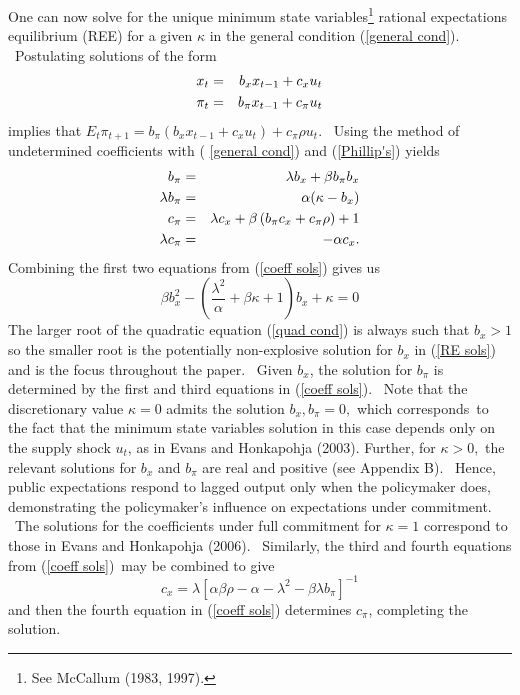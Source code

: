 \documentclass{article}
\begin{document}
\begin{doublespace}
One can now solve for the unique minimum state variables\footnote{%
See McCallum (1983, 1997).} rational expectations equilibrium (REE) for a
given $\kappa $ in the general condition (\ref{general cond}). \ Postulating
solutions of the form%
\begin{eqnarray}
x_{t} &=&b_{x}x_{t-1}+c_{x}u_{t}  \label{RE sols} \\
\pi _{t} &=&b_{\pi }x_{t-1}+c_{\pi }u_{t}  \notag
\end{eqnarray}%
implies that $E_{t}\pi _{t+1}=b_{\pi }\left( b_{x}x_{t-1}+c_{x}u_{t}\right)
+c_{\pi }\rho u_{t}$. \ Using the method of undetermined coefficients with (%
\ref{general cond}) and (\ref{Phillip's}) yields%
\begin{eqnarray}
b_{\pi } &=&\lambda b_{x}+\beta b_{\pi }b_{x}  \label{coeff sols} \\
\lambda b_{\pi } &=&\alpha (\kappa -b_{x})  \notag \\
c_{\pi } &=&\lambda c_{x}+\beta \left( b_{\pi }c_{x}+c_{\pi }\rho \right) +1
\notag \\
\lambda c_{\pi } &=&-\alpha c_{x}.  \notag
\end{eqnarray}%
Combining the first two equations from (\ref{coeff sols}) gives us%
\begin{equation}
\beta b_{x}^{2}-\left( \frac{\lambda ^{2}}{\alpha }+\beta \kappa +1\right)
b_{x}+\kappa =0  \label{quad cond}
\end{equation}%
The larger root of the quadratic equation (\ref{quad cond}) is always such
that $b_{x}>1$ so the smaller root is the potentially non-explosive solution
for $b_{x}$ in (\ref{RE sols}) and is the focus throughout the paper. \
Given $b_{x}$, the solution for $b_{\pi }$ is determined by the first and
third equations in (\ref{coeff sols}). \ Note that the discretionary value $%
\kappa =0$ admits the solution $b_{x},b_{\pi }=0,$ which corresponds\ to the
fact that the minimum state variables solution in this case depends only on
the supply shock $u_{t}$, as in Evans and Honkapohja (2003). Further, for $%
\kappa >0,$ the relevant solutions for $b_{x}$ and $b_{\pi }$ are real and
positive (see Appendix B). \ Hence, public expectations respond to lagged
output only when the policymaker does, demonstrating the policymaker's
influence on expectations under commitment. \ The solutions for the
coefficients under full commitment for $\kappa =1$ correspond to those in
Evans and Honkapohja (2006). \ Similarly, the third and fourth equations
from (\ref{coeff sols})\ may be combined to give%
\begin{equation*}
c_{x}=\lambda \left[ \alpha \beta \rho -\alpha -\lambda ^{2}-\beta \lambda
b_{\pi }\right] ^{-1}
\end{equation*}%
and then the fourth equation in (\ref{coeff sols}) determines $c_{\pi }$,
completing the solution.


\end{doublespace}
\end{document}

